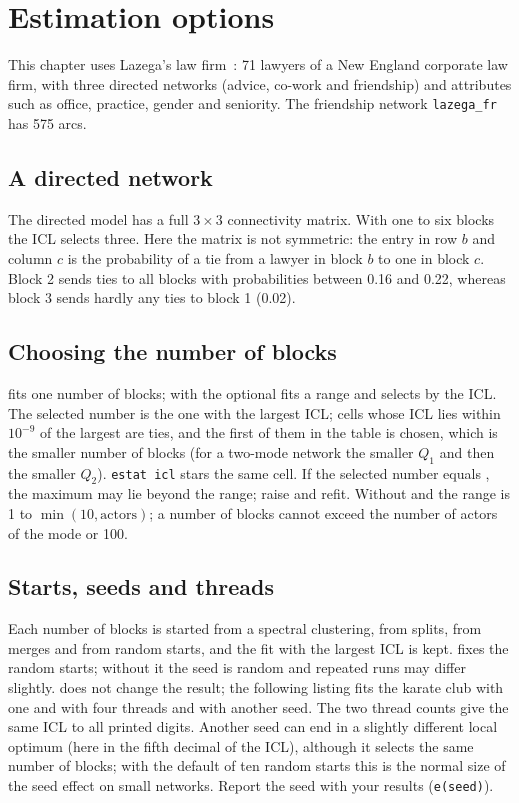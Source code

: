 \chapter{Estimation options}\label{ch:est}

This chapter uses Lazega's law firm~\cite{lazega2001}: 71 lawyers of a New England corporate law firm, with three directed networks (advice, co-work and friendship) and attributes such as office, practice, gender and seniority. The friendship network \texttt{lazega\_fr} has 575 arcs.

\section{A directed network}
The directed model has a full $3\times 3$ connectivity matrix. With one to six blocks the ICL selects three.
Here the matrix is not symmetric: the entry in row $b$ and column $c$ is the probability of a tie from a lawyer in block $b$ to one in block $c$. Block 2 sends ties to all blocks with probabilities between 0.16 and 0.22, whereas block 3 sends hardly any ties to block 1 (0.02).

\section{Choosing the number of blocks}
 fits one number of blocks;  with the optional  fits a range and selects by the ICL. The selected number is the one with the largest ICL; cells whose ICL lies within $10^{-9}$ of the largest are ties, and the first of them in the table is chosen, which is the smaller number of blocks (for a two-mode network the smaller $Q_1$ and then the smaller $Q_2$). \texttt{estat icl} stars the same cell. If the selected number equals , the maximum may lie beyond the range; raise  and refit. Without  and  the range is 1 to $\min(10,\text{actors})$; a number of blocks cannot exceed the number of actors of the mode or 100.

\section{Starts, seeds and threads}
Each number of blocks is started from a spectral clustering, from splits, from merges and from  random starts, and the fit with the largest ICL is kept.  fixes the random starts; without it the seed is random and repeated runs may differ slightly.  does not change the result; the following listing fits the karate club with one and with four threads and with another seed.
The two thread counts give the same ICL to all printed digits. Another seed can end in a slightly different local optimum (here in the fifth decimal of the ICL), although it selects the same number of blocks; with the default of ten random starts this is the normal size of the seed effect on small networks. Report the seed with your results (\texttt{e(seed)}).

